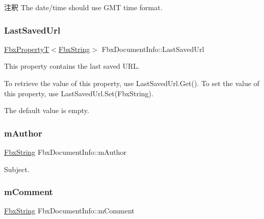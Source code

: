 \begin{DoxyRemark}{注釈}
The date/time should use G\+MT time format. 
\end{DoxyRemark}
\mbox{\label{class_fbx_document_info_a8a4eb2393037c8989307f780cab77ca1}} 
\subsubsection{\texorpdfstring{Last\+Saved\+Url}{LastSavedUrl}}
{\footnotesize\ttfamily \hyperlink{class_fbx_property_t}{Fbx\+PropertyT}$<$\hyperlink{class_fbx_string}{Fbx\+String}$>$ Fbx\+Document\+Info\+::\+Last\+Saved\+Url}

This property contains the last saved U\+RL.

To retrieve the value of this property, use Last\+Saved\+Url.\+Get(). To set the value of this property, use Last\+Saved\+Url.\+Set(\+Fbx\+String).

The default value is empty. \mbox{\label{class_fbx_document_info_a94f6f7586adf1ae4c519f0fd0ab63e7f}} 
\subsubsection{\texorpdfstring{m\+Author}{mAuthor}}
{\footnotesize\ttfamily \hyperlink{class_fbx_string}{Fbx\+String} Fbx\+Document\+Info\+::m\+Author}



Subject. 

\mbox{\label{class_fbx_document_info_ae26126fbe729919670ddc4140a80f517}} 
\subsubsection{\texorpdfstring{m\+Comment}{mComment}}
{\footnotesize\ttfamily \hyperlink{class_fbx_string}{Fbx\+String} Fbx\+Document\+Info\+::m\+Comment}



